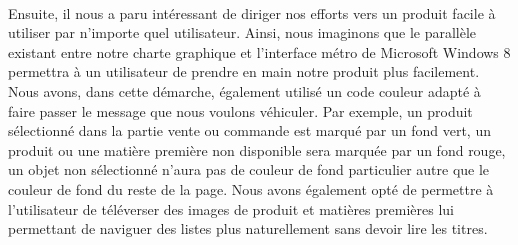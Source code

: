     \paragraph{}
        Ensuite, il nous a paru intéressant de diriger nos efforts vers un
        produit facile à utiliser par n'importe quel utilisateur.
        Ainsi, nous imaginons que le parallèle existant entre notre charte
        graphique et l'interface métro de Microsoft Windows 8 permettra à un
        utilisateur de prendre en main notre produit plus facilement.
        Nous avons, dans cette démarche, également utilisé un code couleur
        adapté à faire passer le message que nous voulons véhiculer.
        Par exemple, un produit sélectionné dans la partie vente ou commande
        est marqué par un fond vert, un produit ou une matière première non
        disponible sera marquée par un fond rouge, un objet non sélectionné
        n'aura pas de couleur de fond particulier autre que le couleur de fond
        du reste de la page.
        Nous avons également opté de permettre à l'utilisateur de téléverser
        des images de produit et matières premières lui permettant de naviguer
        des listes plus naturellement sans devoir lire les titres.